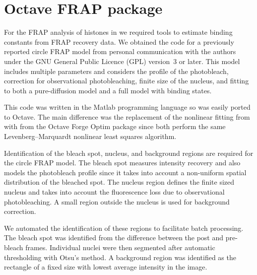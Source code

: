 \section{Octave FRAP package}
\label{sec:software:octave-frap}

For the FRAP analysis of histones
in  we required tools to estimate
binding constants from FRAP recovery data.  We obtained the code for a
previously reported circle FRAP model \citep{mcnally-frap-code} from
personal communication with the authors under the GNU General Public
Licence (GPL) version~3 or later.  This model includes multiple
parameters and considers the profile of the photobleach, correction
for observational photobleaching, finite size of the nucleus, and
fitting to both a pure-diffusion model and a full model with binding
states.

This code was written in the Matlab programming language so was
easily ported to Octave.  The main difference was the replacement of
the nonlinear fitting from  with 
from the Octave Forge Optim package since both perform the same
Levenberg--Marquardt nonlinear least squares algorithm.

Identification of the bleach spot, nucleus, and background regions are
required for the circle FRAP model.  The bleach spot measures
intensity recovery and also models the photobleach profile since it
takes into account a non-uniform spatial distribution of the bleached
spot.  The nucleus region defines the finite sized nucleus and takes
into account the fluorescence loss due to observational
photobleaching.  A small region outside the nucleus is used for
background correction.

We automated the identification of these regions to facilitate
batch processing.  The bleach spot was
identified from the difference between the post and pre-bleach frames.
Individual nuclei were then segmented after automatic thresholding with Otsu's
method.  A background region was identified as the rectangle of a
fixed size with lowest average intensity in the image.

